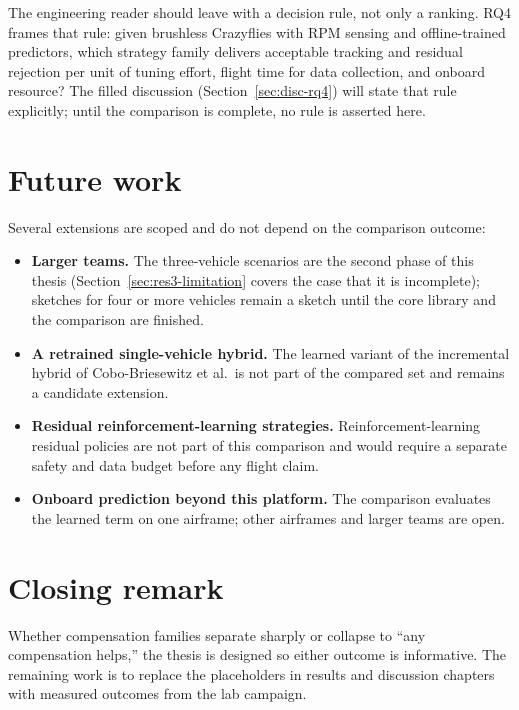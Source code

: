 The engineering reader should leave with a decision rule, not only a ranking. RQ4 frames that rule:
given brushless Crazyflies with RPM sensing and offline-trained predictors, which strategy family
delivers acceptable tracking and residual rejection per unit of tuning effort, flight time for data
collection, and onboard resource? The filled discussion (Section~\ref{sec:disc-rq4}) will state that
rule explicitly; until the comparison is complete, no rule is asserted here.

\section{Future work}
\label{sec:conclusion-future}

Several extensions are scoped and do not depend on the comparison outcome:

\begin{itemize}
  \item \textbf{Larger teams.} The three-vehicle scenarios are the second phase of this thesis
    (Section~\ref{sec:res3-limitation} covers the case that it is incomplete); sketches for four or more vehicles remain
    a sketch until the core library and the comparison are finished.
  \item \textbf{A retrained single-vehicle hybrid.} The learned variant of the incremental hybrid of Cobo-Briesewitz et al.\ is not part of the compared set and remains a candidate extension.
  \item \textbf{Residual reinforcement-learning strategies.} Reinforcement-learning residual policies are not part of this comparison and would require a separate safety and data budget before any flight claim.
  \item \textbf{Onboard prediction beyond this platform.} The comparison evaluates the learned term on one airframe; other airframes and larger teams are open.
\end{itemize}

\section{Closing remark}
\label{sec:conclusion-close}

Whether compensation families separate sharply or collapse to ``any compensation helps,'' the thesis
is designed so either outcome is informative. The remaining work is to replace the placeholders in
results and discussion chapters with measured outcomes from the lab campaign.

